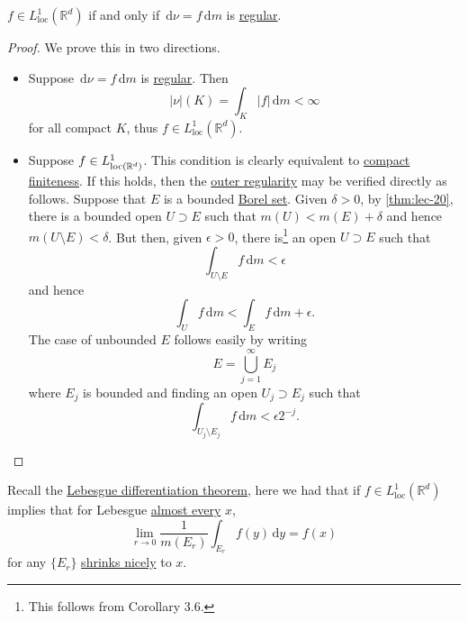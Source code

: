\begin{lemma}
	\(f \in L^1_{\mathrm{loc}}(\mathbb{R}^d)\) if and only if \(\,\mathrm{d}\nu = f \,\mathrm{d}m\) is \hyperref[def:regular]{regular}.
\end{lemma}
\begin{proof}
	We prove this in two directions.
	\begin{itemize}
		\item Suppose \(\,\mathrm{d} \nu = f \,\mathrm{d} m\) is \hyperref[def:regular]{regular}. Then
		      \[
			      \left\vert \nu \right\vert(K) = \int_K \left\vert f \right\vert \,\mathrm{d}m < \infty
		      \]
		      for all compact \(K\), thus \(f \in L^1_{\mathrm{loc}}(\mathbb{R}^d)\).
		\item Suppose \(f\in L^1_{\mathrm{loc}(\mathbb{\MakeUppercase{r}} ^d) }\). This condition is clearly equivalent to
		      \hyperref[def:regular-compact-finite]{compact finiteness}. If this holds, then the \hyperref[def:regular-outer-regularity]{outer regularity}
		      may be verified directly as follows. Suppose that \(E\) is a bounded \hyperref[def:Borel-set]{Borel set}. Given \(\delta > 0\), by \autoref{thm:lec-20},
		      there is a bounded open \(U \supset E\) such that \(m(U) < m(E)+ \delta \) and hence \(m(U\setminus E)< \delta \). But then, given \(\epsilon >0\), there
		      is\footnote{This follows from \cite{folland1999real} Corollary 3.6.} an open \(U \supset E\) such that
		      \[
			      \int _{U\setminus E}f\,\mathrm{d} m < \epsilon
		      \]
		      and hence
		      \[
			      \int _U f\,\mathrm{d} m < \int _E f\,\mathrm{d} m + \epsilon.
		      \]
		      The case of unbounded \(E\) follows easily by writing
		      \[
			      E = \bigcup\limits_{j=1}^{\infty} E_{j}
		      \]
		      where \(E_{j} \) is bounded and finding an open \(U_{j} \supset E_{j} \) such that
		      \[
			      \int _{U_{j} \setminus E_{j} }f \,\mathrm{d} m < \epsilon 2^{-j}.
		      \]
	\end{itemize}
\end{proof}

\begin{prev}
	Recall the \hyperref[thm:Lebesgue-differentiation-theorem]{Lebesgue differentiation theorem}, here we had that if \(f \in L^1_{\mathrm{loc}}(\mathbb{R}^d)\)
	implies that for Lebesgue \hyperref[def:mu-almost-everywhere]{almost every} \(x\),
	\[
		\lim_{r \to 0} \frac{1}{m(E_r)} \int_{E_r} f(y) \,\mathrm{d}y = f(x)
	\]
	for any \(\{E_r\}\) \hyperref[def:shrink-nicely]{shrinks nicely} to \(x\).
\end{prev}

